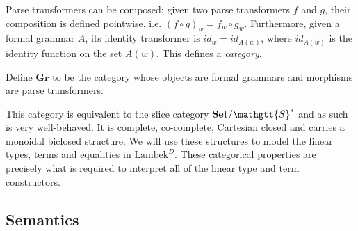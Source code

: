 \documentclass[acmsmall,nonacm]{acmart}
\renewcommand{\Sigma}{\mathgtt{S}}
\newcommand{\Set}{\mathbf{Set}}
\newcommand{\Grammar}{\mathbf{Gr}}
\newcommand{\theoryabbv}{$\textrm{Lambek}^D$\xspace}
\begin{document}
Parse transformers can be composed: given two parse transformers $f$ and $g$,
their composition is defined pointwise, i.e. $(f\circ g)_w = f_w \circ g_w$.
Furthermore, given a formal grammar $A$, its identity transformer is $id_w =
id_{A(w)}$, where $id_{A(w)}$ is the identity function on the set $A(w)$. This
defines a \emph{category}.
\begin{definition}
  Define $\Grammar$ to be the category whose objects are formal
  grammars and morphisms are parse transformers.
\end{definition}
This category is equivalent to the slice category $\Set/\Sigma^*$ and
as such is very well-behaved. It is complete, co-complete, Cartesian
closed and carries a monoidal biclosed structure. We will use these
structures to model the linear types, terms and equalities in
\theoryabbv. These categorical properties are precisely what is
required to interpret all of the linear type and term constructors.

\subsection{Semantics}
\end{document}
